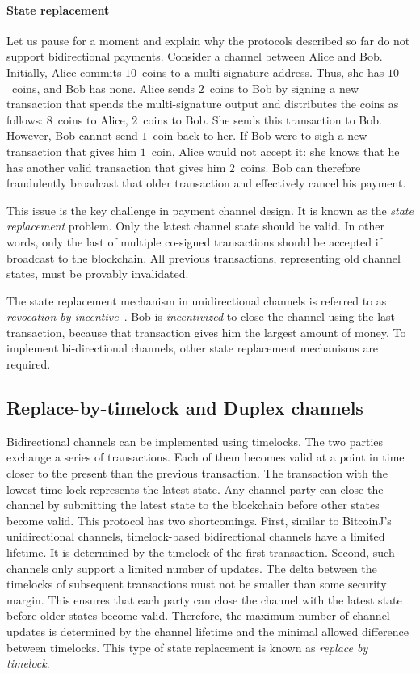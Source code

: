 \paragraph{State replacement}
Let us pause for a moment and explain why the protocols described so far do not support bidirectional payments.
Consider a channel between Alice and Bob.
Initially, Alice commits $10$~coins to a multi-signature address.
Thus, she has $10$~coins, and Bob has none.
Alice sends $2$~coins to Bob by signing a new transaction that spends the multi-signature output and distributes the coins as follows: $8$~coins to Alice, $2$~coins to Bob.
She sends this transaction to Bob.
However, Bob cannot send $1$~coin back to her.
If Bob were to sigh a new transaction that gives him $1$~coin, Alice would not accept it: she knows that he has another valid transaction that gives him $2$~coins.
Bob can therefore fraudulently broadcast that older transaction and effectively cancel his payment.

This issue is the key challenge in payment channel design.
It is known as the \textit{state replacement} problem.
Only the latest channel state should be valid.
In other words, only the last of multiple co-signed transactions should be accepted if broadcast to the blockchain.
All previous transactions, representing old channel states, must be provably invalidated.

The state replacement mechanism in unidirectional channels is referred to as \textit{revocation by incentive}~\cite{Gudgeon2019}.
Bob is \textit{incentivized} to close the channel using the last transaction, because that transaction gives him the largest amount of money.
To implement bi-directional channels, other state replacement mechanisms are required.


\subsection{Replace-by-timelock and Duplex channels}

Bidirectional channels can be implemented using timelocks.
The two parties exchange a series of transactions.
Each of them becomes valid at a point in time closer to the present than the previous transaction.
The transaction with the lowest time lock represents the latest state.
Any channel party can close the channel by submitting the latest state to the blockchain before other states become valid.
This protocol has two shortcomings.
First, similar to BitcoinJ's unidirectional channels, timelock-based bidirectional channels have a limited lifetime.
It is determined by the timelock of the first transaction.
Second, such channels only support a limited number of updates.
The delta between the timelocks of subsequent transactions must not be smaller than some security margin.
This ensures that each party can close the channel with the latest state before older states become valid.
Therefore, the maximum number of channel updates is determined by the channel lifetime and the minimal allowed difference between timelocks.
This type of state replacement is known as \textit{replace by timelock}.

